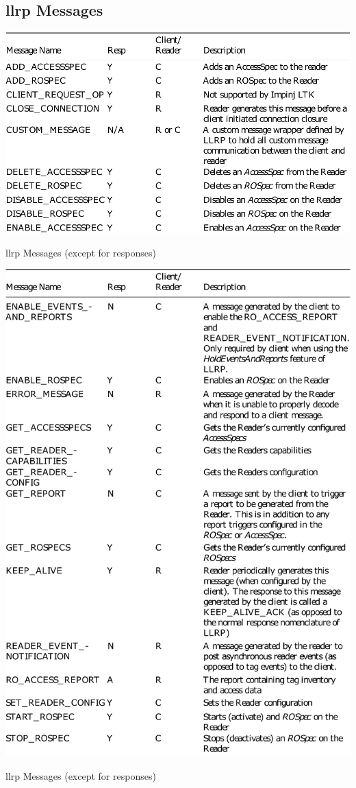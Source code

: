 \begin{appendices}
\clearpage

\section{\ac{llrp} Messages} \label{anx:llrpmessages}
\begin{table}[!ht]
    \centering
    \includegraphics[width=\textwidth]{./figs/02-state-of-the-art/table_llrpmessages_1.pdf}
    \caption{\ac{llrp} Messages (except for responses)~\cite{ImpinjLTKProgrammers}} 
    \label{tab:llrpmessages1}
\end{table}


\begin{table}
    \centering
    \includegraphics[width=\textwidth]{./figs/02-state-of-the-art/table_llrpmessages_2.pdf}
    \caption{\ac{llrp} Messages (except for responses)~\cite{ImpinjLTKProgrammers}} 
    \label{tab:llrpmessages2}
\end{table}

\end{appendices}